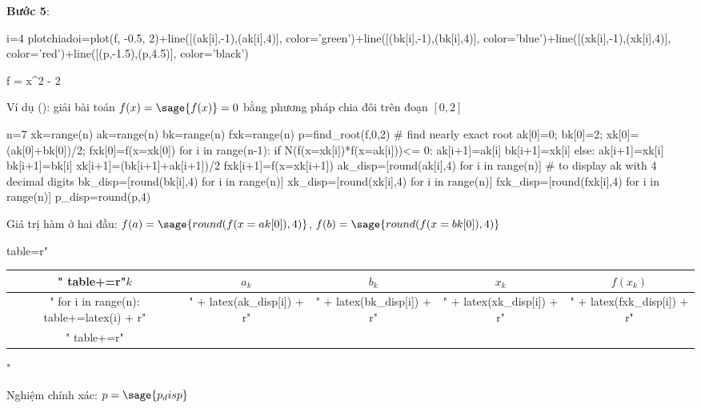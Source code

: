 \documentclass[12pt]{article}
\begin{document}
\textbf{Bước 5}:

\begin{sagesilent}
 i=4
 plotchiadoi=plot(f, -0.5, 2)+line([(ak[i],-1),(ak[i],4)], color='green')+line([(bk[i],-1),(bk[i],4)], color='blue')+line([(xk[i],-1),(xk[i],4)], color='red')+line([(p,-1.5),(p,4.5)], color='black')
\end{sagesilent}


\newpage{}

\begin{sagesilent}
f = x^2 - 2
\end{sagesilent}
Ví dụ (): giải bài toán $f(x)=\sage{f(x)}=0$ bằng phương pháp chia đôi trên đoạn $[0,2]$

\begin{sagesilent}
 n=7
 xk=range(n)
 ak=range(n)
 bk=range(n)
 fxk=range(n)
 p=find_root(f,0,2) # find nearly exact root
 ak[0]=0; bk[0]=2; xk[0]=(ak[0]+bk[0])/2; fxk[0]=f(x=xk[0])
 for i in range(n-1):
    if N(f(x=xk[i])*f(x=ak[i]))<= 0:
        ak[i+1]=ak[i]
        bk[i+1]=xk[i]
    else:    
        ak[i+1]=xk[i]
        bk[i+1]=bk[i]
    xk[i+1]=(bk[i+1]+ak[i+1])/2
    fxk[i+1]=f(x=xk[i+1])
 ak_disp=[round(ak[i],4) for i in range(n)] # to display ak with 4 decimal digits
 bk_disp=[round(bk[i],4) for i in range(n)]
 xk_disp=[round(xk[i],4) for i in range(n)]
 fxk_disp=[round(fxk[i],4) for i in range(n)]
 p_disp=round(p,4)
\end{sagesilent}

Giá trị hàm ở hai đầu: $f(a)=\sage{round(f(x=ak[0]),4)}$, $f(b)=\sage{round(f(x=bk[0]),4)}$

\begin{sagesilent}
table=r"\begin{tabular}{ccccc}"
table+=r"$k$ & $a_k$ & $b_k$ & $x_k$ & $f(x_k)$ \\ \hline"
for i in range(n):
  table+=latex(i) + r"&" + latex(ak_disp[i]) + r"&" + latex(bk_disp[i]) + r"&" + latex(xk_disp[i]) + r"&" + latex(fxk_disp[i]) + r"\\"
table+=r"\end{tabular}"
\end{sagesilent}

Nghiệm chính xác: $p=\sage{p_disp}$
\end{document}
